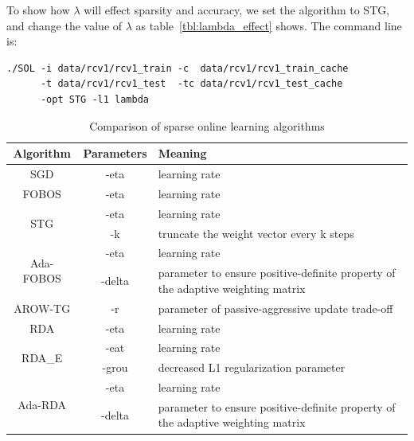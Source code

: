 \documentclass[11pt,a4paper]{article}
\begin{document}
To show how $\lambda$ will effect sparsity and accuracy, we set the algorithm
to STG, and change the value of $\lambda$ as table~\ref{tbl:lambda_effect} shows.
The command line is:
\lstset{language=bash,}
\begin{lstlisting}
./SOL -i data/rcv1/rcv1_train -c  data/rcv1/rcv1_train_cache 
      -t data/rcv1/rcv1_test  -tc data/rcv1/rcv1_test_cache 
      -opt STG -l1 lambda
\end{lstlisting}
\begin{table}[!t]
            \renewcommand{\arraystretch}{1.3}
            \caption{Comparison of sparse online learning algorithms}
            \label{tbl:param_illustrate}
            \centering
            \begin{tabular}{|c|c|p{9cm}|}
                \hline
                Algorithm & Parameters & Meaning\\
                \hline
                SGD & -eta & learning rate \\
                \hline
                FOBOS & -eta & learning rate \\
                \hline
                \multirow{2}{*}{STG}& -eta & learning rate \\
                \cline{2-3}
                &-k & truncate the weight vector every k steps \\
                \hline
                \multirow{2}{*}{Ada-FOBOS}& -eta & learning rate \\
                \cline{2-3}
                & -delta & parameter to ensure positive-definite property of the adaptive weighting matrix \\
                \hline
                AROW-TG& -r &  parameter of passive-aggressive update trade-off\\
                \hline
                RDA&  -eta & learning rate \\
                \hline
                \multirow{2}{*}{RDA\_E}&  -eat &  learning rate \\
                \cline{2-3}
                &-grou & decreased L1 regularization parameter \\
                \hline
                \multirow{2}{*}{Ada-RDA}& -eta & learning rate \\
                \cline{2-3}
                & -delta & parameter to ensure positive-definite property of the adaptive weighting matrix \\
                \hline

\end{tabular}
\end{table}
\end{document}
